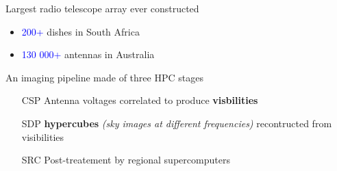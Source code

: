 \documentclass[usenames,dvipsnames]{beamer}
\begin{document}
{{\begin{columns}[t]
\begin{column}{.4\linewidth}
\begin{center}
\end{center}
\end{column}
\begin{column}{.6\linewidth}
    \begin{block}{Largest radio telescope array ever constructed}
          \begin{itemize}
            \item \textcolor{blue}{200+} dishes in South Africa
            \item \textcolor{blue}{130 000+} antennas in Australia
            \end{itemize}
        \end{block}

            \begin{block}{An imaging pipeline made of three HPC stages}
            \begin{itemize}
                \item[CSP] Antenna voltages correlated to produce \textbf{visbilities} 
                \item[SDP] \textbf{hypercubes} \textit{(sky images at different frequencies)} recontructed from visibilities
                \item[SRC] Post-treatement by regional supercomputers
                \end{itemize}
    \end{block}
   

\end{column}
\end{columns}

   
}
}
\end{document}
